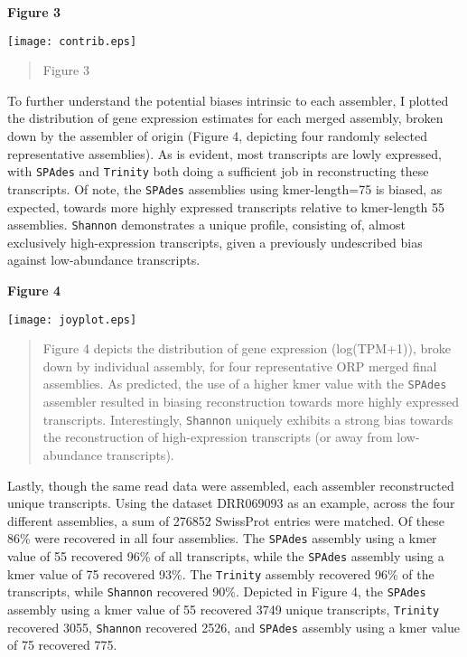 \documentclass[10pt,letterpaper]{article}
\begin{document}
\textbf{\hypertarget{Figure 3}{Figure 3}} \\
\centerline{\texttt{[image: contrib.eps]}}
\begin{quote}
\small{Figure 3 }
\end{quote} 


To further understand the potential biases intrinsic to each assembler, I plotted the distribution of gene expression estimates for each merged assembly, broken down by the assembler of origin (Figure 4, depicting four randomly selected representative assemblies). As is evident, most transcripts are lowly expressed, with \texttt{SPAdes} and \texttt{Trinity} both doing a sufficient job in reconstructing these transcripts. Of note, the \texttt{SPAdes} assemblies using kmer-length=75 is biased, as expected, towards more highly expressed transcripts relative to kmer-length 55 assemblies. \texttt{Shannon} demonstrates a unique profile, consisting of, almost exclusively high-expression transcripts, given a previously undescribed bias against low-abundance transcripts.      


\textbf{\hypertarget{Figure 4}{Figure 4}} \\
\centerline{\texttt{[image: joyplot.eps]}}
\begin{quote}
\small{Figure 4 depicts the distribution of gene expression (log(TPM+1)), broke down by individual assembly, for four representative ORP merged final assemblies. As predicted, the use of a higher kmer value with the \texttt{SPAdes} assembler resulted in biasing reconstruction towards more highly expressed transcripts. Interestingly, \texttt{Shannon} uniquely exhibits a strong bias towards the reconstruction of high-expression transcripts (or away from low-abundance transcripts).}
\end{quote} 

Lastly, though the same read data were assembled, each assembler reconstructed unique transcripts. Using the dataset DRR069093 as an example, across the four different assemblies, a sum of 276852 SwissProt entries were matched. Of these 86\% were recovered in all four assemblies. The \texttt{SPAdes} assembly using a kmer value of 55 recovered 96\% of all transcripts, while the \texttt{SPAdes} assembly using a kmer value of 75 recovered 93\%. The \texttt{Trinity} assembly recovered 96\% of the transcripts, while \texttt{Shannon} recovered 90\%. Depicted in Figure 4, the \texttt{SPAdes} assembly using a kmer value of 55 recovered 3749 unique transcripts, \texttt{Trinity} recovered 3055, \texttt{Shannon} recovered 2526, and \texttt{SPAdes} assembly using a kmer value of 75 recovered 775. 
\end{document}
